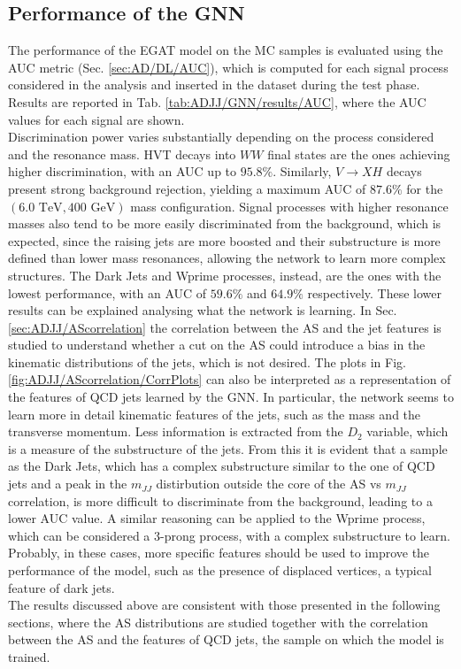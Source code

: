 \subsection{Performance of the GNN}\label{sec:ADJJ/GNN/results}
The performance of the EGAT model on the MC samples is evaluated using the AUC metric (Sec. \ref{sec:AD/DL/AUC}), which is computed for each signal process considered in the analysis and inserted in the dataset during the test phase.
Results are reported in Tab. \ref{tab:ADJJ/GNN/results/AUC}, where the AUC values for each signal are shown.\\
Discrimination power varies substantially depending on the process considered and the resonance mass. 
HVT decays into $WW$ final states are the ones achieving higher discrimination, with an AUC up to $95.8\%$.  
Similarly, $V \to XH$ decays present strong background rejection, yielding a maximum AUC of $87.6\%$ for the $(6.0\text{ TeV}, 400\text{ GeV})$ mass configuration.
Signal processes with higher resonance masses also tend to be more easily discriminated from the background, which is expected, since the raising jets are more boosted and their substructure is more defined than lower mass resonances, allowing the network to learn more complex structures.
The Dark Jets and Wprime processes, instead, are the ones with the lowest performance, with an AUC of $59.6\%$ and $64.9\%$ respectively.
These lower results can be explained analysing what the network is learning.
In Sec. \ref{sec:ADJJ/AScorrelation} the correlation between the AS and the jet features is studied to understand whether a cut on the AS could introduce a bias in the kinematic distributions of the jets, which is not desired.
The plots in Fig. \ref{fig:ADJJ/AScorrelation/CorrPlots} can also be interpreted as a representation of the features of QCD jets learned by the GNN.
In particular, the network seems to learn more in detail kinematic features of the jets, such as the mass and the transverse momentum.
Less information is extracted from the $D_2$ variable, which is a measure of the substructure of the jets.
From this it is evident that a sample as the Dark Jets, which has a complex substructure similar to the one of QCD jets and a peak in the $m_{JJ}$ distirbution outside the core of the AS vs $m_{JJ}$ correlation, is more difficult to discriminate from the background, leading to a lower AUC value.
A similar reasoning can be applied to the Wprime process, which can be considered a 3-prong process, with a complex substructure to learn.
Probably, in these cases, more specific features should be used to improve the performance of the model, such as the presence of displaced vertices, a typical feature of dark jets.\\
The results discussed above are consistent with those presented in the following sections, where the AS distributions are studied together with the correlation between the AS and the features of QCD jets, the sample on which the model is trained.

